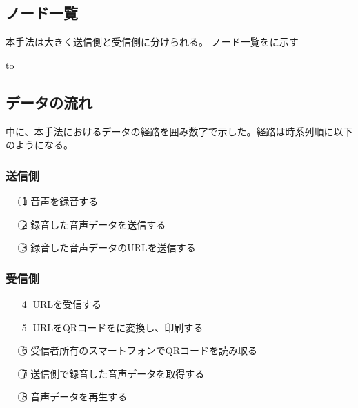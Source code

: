\documentclass[submit,techrep,noauthor]{ipsj}
\begin{document}
\subsection{ノード一覧}
本手法は大きく送信側と受信側に分けられる。
ノード一覧をに示す

\begin{table}[tb] 
\caption{ノード一覧} 
\label{tab:sys-nodes}
\hbox to
\end{table}

\subsection{データの流れ}
\label{dataflow}
中に、本手法におけるデータの経路を囲み数字で示した。経路は時系列順に以下のようになる。
\subsubsection{送信側}
\begin{itemize}
    \item[\textcircled{\scriptsize 1}] 音声を録音する
    \item[\textcircled{\scriptsize 2}] 録音した音声データを送信する
    \item[\textcircled{\scriptsize 3}] 録音した音声データのURLを送信する 
\end{itemize}

\subsubsection{受信側}
\begin{itemize}
    \item[\textcircled{\scriptsize 4}] URLを受信する 
    \item[\textcircled{\scriptsize 5}] URLをQRコードをに変換し、印刷する 
    \item[\textcircled{\scriptsize 6}] 受信者所有のスマートフォンでQRコードを読み取る 
    \item[\textcircled{\scriptsize 7}] 送信側で録音した音声データを取得する 
    \item[\textcircled{\scriptsize 8}] 音声データを再生する       
\end{itemize}
\end{document}
